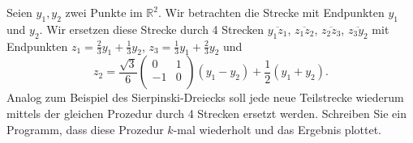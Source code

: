 \begin{aufg}[0]
Seien $y_1,y_2$ zwei Punkte im $\mathbb{R}^2$. Wir betrachten die Strecke mit
Endpunkten $y_1$ und $y_2$. Wir ersetzen  diese Strecke durch 4 Strecken 
$\overline{y_1 z_1}$, $\overline{z_1 z_2}$, $\overline{z_2 z_3}$,
$\overline{z_3 y_2}$ mit Endpunkten $z_1=\frac23 y_1 + \frac13 y_2$,
$z_3=\frac13 y_1 + \frac23 y_2$ und 
\[ z_2 = \frac{\sqrt{3}}{6} \left( \begin{array}{cc}
0 & 1 \\ -1 & 0 \\
\end{array} \right)
(y_1 - y_2) + \frac12 (y_1 + y_2). \]
Analog zum Beispiel des Sierpinski-Dreiecks soll jede neue Teilstrecke
wiederum mittels der gleichen Prozedur durch 4 Strecken ersetzt werden. 
Schreiben Sie ein Programm, dass
diese Prozedur $k$-mal wiederholt und das Ergebnis plottet.
\end{aufg}